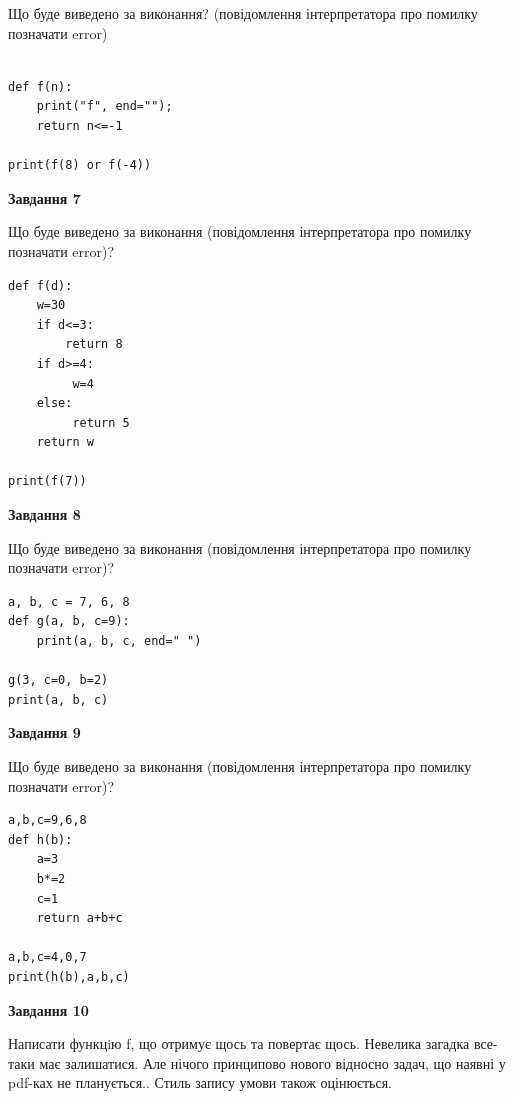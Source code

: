 \documentclass[12pt, ukrainian]{article}
\begin{document}
{\begin {large}
Що буде виведено за виконання? (повідомлення інтерпретатора про помилку позначати error)\par
\begin{verbatim}

def f(n):
    print("f", end="");
    return n<=-1

print(f(8) or f(-4))
\end{verbatim}

{\begin {center}\textbf{Завдання 7}\end {center}}

Що буде виведено за виконання (повідомлення інтерпретатора про помилку позначати error)?\par
\begin{verbatim}
def f(d):
    w=30
    if d<=3: 
        return 8
    if d>=4:
         w=4
    else:
         return 5
    return w

print(f(7))
\end{verbatim}

{\begin {center}\textbf{Завдання 8}\end {center}}

Що буде виведено за виконання (повідомлення інтерпретатора про помилку позначати error)?\par
\begin{verbatim}
a, b, c = 7, 6, 8
def g(a, b, c=9):
    print(a, b, c, end=" ")

g(3, c=0, b=2)
print(a, b, c)
\end{verbatim}

{\begin {center}\textbf{Завдання 9}\end {center}}

Що буде виведено за виконання (повідомлення інтерпретатора про помилку позначати error)?\par
\begin{verbatim}
a,b,c=9,6,8
def h(b):
    a=3
    b*=2
    c=1
    return a+b+c

a,b,c=4,0,7
print(h(b),a,b,c)
\end{verbatim}

{\begin {center}\textbf{Завдання 10}\end {center}}


Написати функцiю f, що отримує щось та повертає щось. Невелика загадка все-таки має залишатися. Але нічого принципово нового відносно задач, що наявні у pdf-ках не планується.. Стиль запису умови також оцінюється.\par
\end {large}}
\newpage
\end{document}
